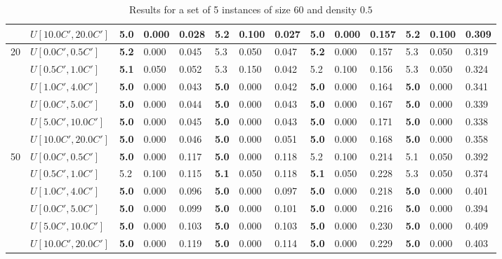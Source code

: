 \begin{table}[h]
{\begin{tabular}{|l|l||l|l|l||l|l|l||l|l|l||l|l|l|}
       & $U[10.0C',20.0C']$ & \textbf{5.0} & 0.000 & 0.028 & 5.2 & 0.100 & 0.027 & \textbf{5.0} & 0.000 & 0.157 & 5.2 & 0.100 & 0.309 \\
      \hline\hline
      \multirow{6}{*}{20} & $U[0.0C',0.5C']$ & \textbf{5.2} & 0.000 & 0.045 & 5.3 & 0.050 & 0.047 & \textbf{5.2} & 0.000 & 0.157 & 5.3 & 0.050 & 0.319 \\
       & $U[0.5C',1.0C']$ & \textbf{5.1} & 0.050 & 0.052 & 5.3 & 0.150 & 0.042 & 5.2 & 0.100 & 0.156 & 5.3 & 0.050 & 0.324 \\
       & $U[1.0C',4.0C']$ & \textbf{5.0} & 0.000 & 0.043 & \textbf{5.0} & 0.000 & 0.042 & \textbf{5.0} & 0.000 & 0.164 & \textbf{5.0} & 0.000 & 0.341 \\
       & $U[0.0C',5.0C']$ & \textbf{5.0} & 0.000 & 0.044 & \textbf{5.0} & 0.000 & 0.043 & \textbf{5.0} & 0.000 & 0.167 & \textbf{5.0} & 0.000 & 0.339 \\
       & $U[5.0C',10.0C']$ & \textbf{5.0} & 0.000 & 0.045 & \textbf{5.0} & 0.000 & 0.043 & \textbf{5.0} & 0.000 & 0.171 & \textbf{5.0} & 0.000 & 0.338 \\
       & $U[10.0C',20.0C']$ & \textbf{5.0} & 0.000 & 0.046 & \textbf{5.0} & 0.000 & 0.051 & \textbf{5.0} & 0.000 & 0.168 & \textbf{5.0} & 0.000 & 0.358 \\
      \hline\hline
      \multirow{6}{*}{50} & $U[0.0C',0.5C']$ & \textbf{5.0} & 0.000 & 0.117 & \textbf{5.0} & 0.000 & 0.118 & 5.2 & 0.100 & 0.214 & 5.1 & 0.050 & 0.392 \\
       & $U[0.5C',1.0C']$ & 5.2 & 0.100 & 0.115 & \textbf{5.1} & 0.050 & 0.118 & \textbf{5.1} & 0.050 & 0.228 & 5.3 & 0.050 & 0.374 \\
       & $U[1.0C',4.0C']$ & \textbf{5.0} & 0.000 & 0.096 & \textbf{5.0} & 0.000 & 0.097 & \textbf{5.0} & 0.000 & 0.218 & \textbf{5.0} & 0.000 & 0.401 \\
       & $U[0.0C',5.0C']$ & \textbf{5.0} & 0.000 & 0.099 & \textbf{5.0} & 0.000 & 0.101 & \textbf{5.0} & 0.000 & 0.216 & \textbf{5.0} & 0.000 & 0.394 \\
       & $U[5.0C',10.0C']$ & \textbf{5.0} & 0.000 & 0.103 & \textbf{5.0} & 0.000 & 0.103 & \textbf{5.0} & 0.000 & 0.230 & \textbf{5.0} & 0.000 & 0.409 \\
       & $U[10.0C',20.0C']$ & \textbf{5.0} & 0.000 & 0.119 & \textbf{5.0} & 0.000 & 0.114 & \textbf{5.0} & 0.000 & 0.229 & \textbf{5.0} & 0.000 & 0.403 \\
      \hline
      \end{tabular}
      }
      \caption{Results for a set of 5 instances of size $60$ and density $0.5$}
      \label{tab:pcpn60}\end{table}


